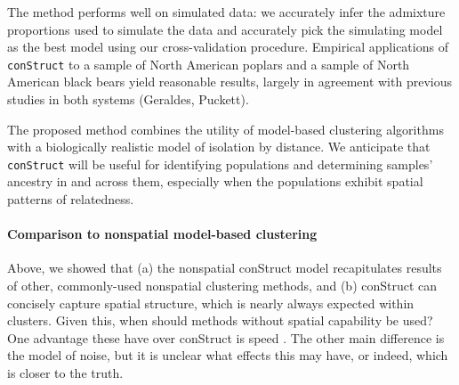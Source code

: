\documentclass[12pt]{article}
\newcommand{\plr}[1]{{\it\color{purple}{(#1)}}}
\begin{document}
The method performs well on simulated data:
we accurately infer the admixture proportions used to simulate the data 
and accurately pick the simulating model as the best model using our cross-validation procedure.
Empirical applications of \texttt{conStruct} to a sample of North American poplars 
and a sample of North American black bears yield reasonable results, 
largely in agreement with previous studies in both systems (Geraldes, Puckett).

The proposed method combines the utility of model-based clustering algorithms 
with a biologically realistic model of isolation by distance.
We anticipate that \texttt{conStruct} will be useful for identifying populations 
and determining samples' ancestry in and across them, 
especially when the populations exhibit spatial patterns of relatedness.

\paragraph{Comparison to nonspatial model-based clustering}
Above, we \plr{hopefully?} showed that 
(a) the nonspatial conStruct model recapitulates results of 
other, commonly-used nonspatial clustering methods,
and 
(b) conStruct can concisely capture spatial structure, which is nearly always expected within clusters.
Given this, when should methods without spatial capability be used?
One advantage these have over conStruct is speed \plr{details?}.
The other main difference is the model of noise,
but it is unclear what effects this may have,
or indeed, which is closer to the truth.
\end{document}
